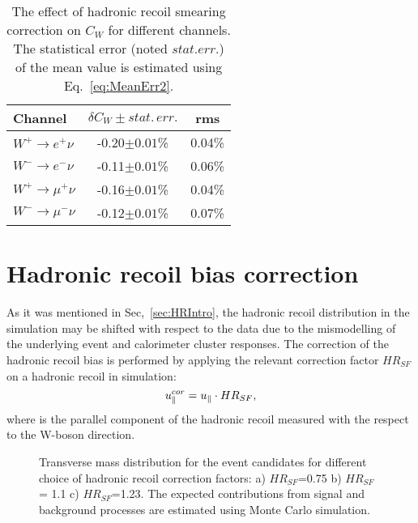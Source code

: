  \begin{table}[!t]
 \caption{The effect of hadronic recoil smearing correction on $C_{W}$ for different channels. The statistical error (noted $stat.err.$) of the mean value is estimated using Eq.~\ref{eq:MeanErr2}.}
\label{SmearCW}
\begin{center}
\begin{tabular}{| l  | c | c | }
\hline
Channel & $\delta C_W \pm stat.\, err.$ & rms \\
\hline
\hline
$W^{+} \to e^{+}\nu$ & -0.20$\pm0.01$\% & 0.04\% \\
$W^{-} \to e^{-}\nu$ & -0.11$\pm0.01$\% &  0.06\% \\
\hline
$W^{+} \to \mu^{+}\nu$ & -0.16$\pm0.01$\% & 0.04\% \\
$W^{-} \to \mu^{-}\nu$ & -0.12$\pm0.01$\% & 0.07\% \\
\hline
\end{tabular}
\end{center}

\end{table}

\section{Hadronic recoil bias correction}\label{sec:HRBias}


As it was mentioned in Sec,~\ref{sec:HRIntro}, the hadronic recoil distribution in the simulation may be shifted with respect to the data due to the mismodelling of the underlying event and calorimeter cluster responses. The correction of the hadronic recoil bias is performed by applying the relevant correction factor $HR_{SF}$ on a hadronic recoil in simulation:
\begin{equation}
u_{\parallel}^{cor}=u_{\parallel} \cdot HR_{SF},
\end{equation}
where \upar is the parallel component of the hadronic recoil measured with the respect to the W-boson direction.

\begin{figure}[!b]
\endminipage\hfill
{}
\endminipage\hfill
{}%
\endminipage
\caption{Transverse mass distribution for the \wenu event candidates for different  choice of hadronic recoil correction factors: a) $HR_{SF}$=0.75 b) $HR_{SF}$= 1.1 c) $HR_{SF}$=1.23. The expected contributions from signal and background processes are estimated using Monte Carlo simulation.}
\label{HadronRecoilScaleMtW}
\end{figure}

